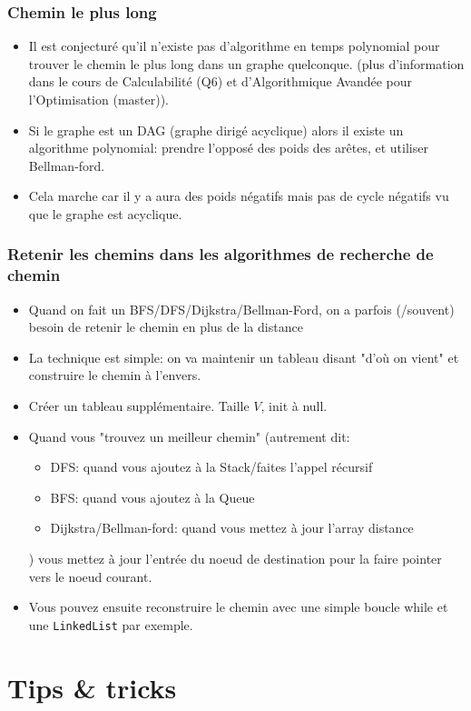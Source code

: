 \documentclass[8pt,aspectratio=169]{beamer}
\begin{document}
\begin{frame}[fragile]
\frametitle{Chemin le plus long}
\begin{itemize}
	\item Il est conjecturé qu'il n'existe pas d'algorithme en temps polynomial pour trouver le chemin le plus long dans un graphe quelconque. (plus d'information dans le cours de Calculabilité (Q6) et d'Algorithmique Avandée pour l'Optimisation (master)).
	\item Si le graphe est un DAG (graphe dirigé acyclique) alors il existe un algorithme polynomial: prendre l'opposé des poids des arêtes, et utiliser Bellman-ford.
	\item Cela marche car il y a aura des poids négatifs mais pas de cycle négatifs vu que le graphe est acyclique.
\end{itemize}
\end{frame}

\begin{frame}
\frametitle{Retenir les chemins dans les algorithmes de recherche de chemin}
\begin{itemize}
	\item Quand on fait un BFS/DFS/Dijkstra/Bellman-Ford, on a parfois (/souvent) besoin de retenir le chemin en plus de la distance
	\item La technique est simple: on va maintenir un tableau disant "d'où on vient" et construire le chemin à l'envers.
	\item Créer un tableau supplémentaire. Taille $V$, init à null.
	\item Quand vous "trouvez un meilleur chemin" (autrement dit:
	\begin{itemize}
		\item DFS: quand vous ajoutez à la Stack/faites l'appel récursif
		\item BFS: quand vous ajoutez à la Queue
		\item Dijkstra/Bellman-ford: quand vous mettez à jour l'array distance
	\end{itemize}
	)
	vous mettez à jour l'entrée du noeud de destination pour la faire pointer vers le noeud courant.
	\item Vous pouvez ensuite reconstruire le chemin avec une simple boucle while et une \texttt{LinkedList} par exemple.
\end{itemize}
\end{frame}

\section{Tips \& tricks}
\end{document}
